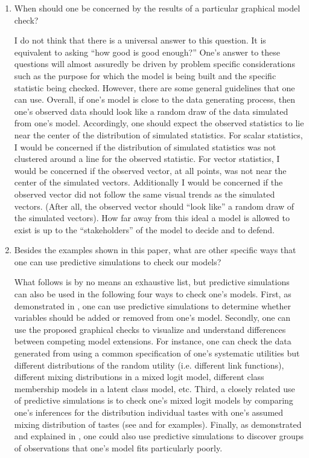 \documentclass[preprint]{elsarticle}
\newenvironment{QandA}{\begin{enumerate}[label=\bfseries\alph*.]\bfseries}
                      {\end{enumerate}}
\newenvironment{answered}{\par\normalfont}{}
\begin{document}
\begin{appendices}
\begin{QandA}
   \item When should one be concerned by the results of a particular graphical model check?
       \begin{answered}
           I do not think that there is a universal answer to this question. It is equivalent to asking ``how good is good enough?'' One's answer to these questions will almost assuredly be driven by problem specific considerations such as the purpose for which the model is being built and the specific statistic being checked. However, there are some general guidelines that one can use. Overall, if one's model is close to the data generating process, then one's observed data should look like a random draw of the data simulated from one's model. Accordingly, one should expect the observed statistics to lie near the center of the distribution of simulated statistics. For scalar statistics, I would be concerned if the distribution of simulated statistics was not clustered around a line for the observed statistic. For vector statistics, I would be concerned if the observed vector, at all points, was not near the center of the simulated vectors. Additionally I would be concerned if the observed vector did not follow the same visual trends as the simulated vectors. (After all, the observed vector should ``look like'' a random draw of the simulated vectors). How far away from this ideal a model is allowed to exist is up to the ``stakeholders'' of the model to decide and to defend.
       \end{answered}

   \item Besides the examples shown in this paper, what are other specific ways that one can use predictive simulations to check our models?
       \begin{answered}
           What follows is by no means an exhaustive list, but predictive simulations can also be used in the following four ways to check one's models. First, as demonstrated in \citet{pardoe_2002_graphical}, one can use predictive simulations to determine whether variables should be added or removed from one's model. Secondly, one can use the proposed graphical checks to visualize and understand differences between competing model extensions. For instance, one can check the data generated from using a common specification of one's systematic utilities but different distributions of the random utility (i.e. different link functions), different mixing distributions in a mixed logit model, different class membership models in a latent class model, etc. Third, a closely related use of predictive simulations is to check one's mixed logit models by comparing one's inferences for the distribution individual tastes with one's assumed mixing distribution of tastes (see \citet{allenby_marketing_1998} and \citet{gilbride_posterior_2010} for examples). Finally, as demonstrated and explained in \citet{kucukelbir_evaluating_2017}, one could also use predictive simulations to discover groups of observations that one's model fits particularly poorly.
       \end{answered}
\end{QandA}


\end{appendices}
\end{document}
